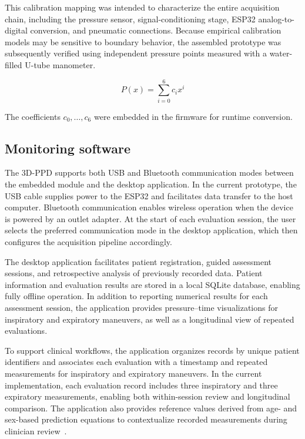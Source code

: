 \documentclass{ieeeaccess}
\begin{document}
{This calibration mapping was intended to characterize the entire acquisition chain, including the pressure sensor, signal-conditioning stage, ESP32 analog-to-digital conversion, and pneumatic connections. Because empirical calibration models may be sensitive to boundary behavior, the assembled prototype was subsequently verified using independent pressure points measured with a water-filled U-tube manometer.}

\begin{equation}
\label{eq:poly_symbolic}
P(x) = \sum_{i=0}^{6} c_i x^i
\end{equation}

The coefficients \(c_0,\dots,c_6\) were embedded in the firmware for runtime conversion.

\subsection{Monitoring software}

The 3D-PPD supports both USB and Bluetooth communication modes between the embedded module and the desktop application. In the current prototype, the USB cable supplies power to the ESP32 and facilitates data transfer to the host computer. Bluetooth communication enables wireless operation when the device is powered by an outlet adapter. At the start of each evaluation session, the user selects the preferred communication mode in the desktop application, which then configures the acquisition pipeline accordingly.

The desktop application facilitates patient registration, guided assessment sessions, and retrospective analysis of previously recorded data. Patient information and evaluation results are stored in a local SQLite database, enabling fully offline operation. In addition to reporting numerical results for each assessment session, the application provides pressure--time visualizations for inspiratory and expiratory maneuvers, as well as a longitudinal view of repeated evaluations.

To support clinical workflows, the application organizes records by unique patient identifiers and associates each evaluation with a timestamp and repeated measurements for inspiratory and expiratory maneuvers. In the current implementation, each evaluation record includes three inspiratory and three expiratory measurements, enabling both within-session review and longitudinal comparison. The application also provides reference values derived from age- and sex-based prediction equations to contextualize recorded measurements during clinician review~\cite{araujoReferenceValuesRespiratory2024}.
\end{document}
